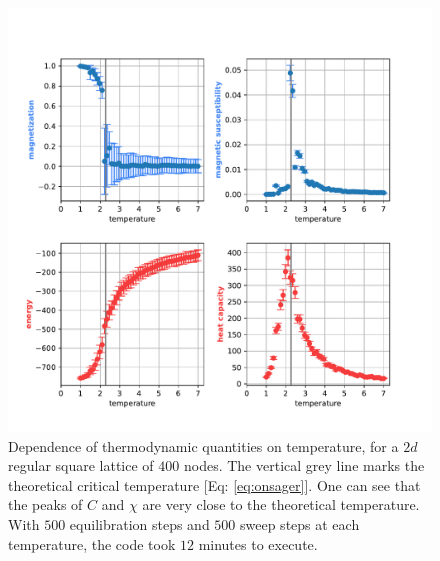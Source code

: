 {\begin{figure}[H]
    \centering
    \includegraphics[width=\linewidth]{latex_source/images/ising/2d_scaling.pdf}
    \caption{Dependence of thermodynamic quantities on temperature, for a $2d$ regular square lattice of $400$ nodes. The vertical grey line marks the theoretical critical temperature [Eq: \ref{eq:onsager}]. One can see that the peaks of $C$ and $\chi$ are very close to the theoretical temperature. With $500$ equilibration steps and $500$ sweep steps at each temperature, the code took $12$ minutes to execute.}
    \label{fig:2d_scaling}
\end{figure}
}
